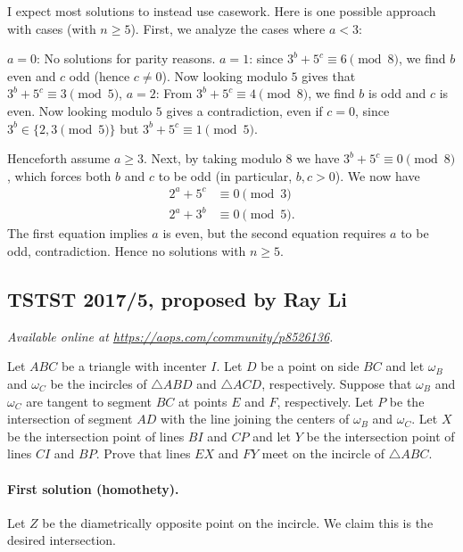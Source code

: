 \documentclass[11pt]{scrartcl}
\begin{document}
I expect most solutions to instead use casework.
Here is one possible approach with cases (with $n \ge 5$).
First, we analyze the cases where $a < 3$:
\begin{itemize}
  \ii $a=0$: No solutions for parity reasons.
  \ii $a=1$: since $3^b + 5^c \equiv 6 \pmod 8$,
  we find $b$ even and $c$ odd (hence $c \neq 0$).
  Now looking modulo $5$ gives that $3^b + 5^c \equiv 3 \pmod 5$,
  \ii $a=2$: From $3^b + 5^c \equiv 4 \pmod 8$,
  we find $b$ is odd and $c$ is even.
  Now looking modulo $5$ gives a contradiction,
  even if $c = 0$,
  since $3^b \in \{2,3 \pmod 5\}$ but $3^b + 5^c \equiv 1 \pmod 5$.
\end{itemize}
Henceforth assume $a \ge 3$.
Next, by taking modulo $8$ we have $3^b+5^c \equiv 0 \pmod 8$,
which forces both $b$ and $c$ to be odd (in particular, $b,c > 0$).
We now have
\begin{align*}
  2^a + 5^c &\equiv 0 \pmod 3 \\
  2^a + 3^b &\equiv 0 \pmod 5.
\end{align*}
The first equation implies $a$ is even,
but the second equation requires $a$ to be odd, contradiction.
Hence no solutions with $n \ge 5$.
\pagebreak

\subsection{TSTST 2017/5, proposed by Ray Li}
\textsl{Available online at \url{https://aops.com/community/p8526136}.}
\begin{mdframed}[style=mdpurplebox,frametitle={Problem statement}]
Let $ABC$ be a triangle with incenter $I$.
Let $D$ be a point on side $BC$ and let $\omega_B$ and $\omega_C$
be the incircles of $\triangle ABD$ and $\triangle ACD$, respectively.
Suppose that $\omega_B$ and $\omega_C$ are tangent to segment $BC$
at points $E$ and $F$, respectively.
Let $P$ be the intersection of segment $AD$ with the
line joining the centers of $\omega_B$ and $\omega_C$.
Let $X$ be the intersection point of lines $BI$ and $CP$
and let $Y$ be the intersection point of lines $CI$ and $BP$.
Prove that lines $EX$ and $FY$ meet on the incircle of $\triangle ABC$.
\end{mdframed}
\paragraph{First solution (homothety).}
Let $Z$ be the diametrically opposite point on the incircle.
We claim this is the desired intersection.
\end{document}
